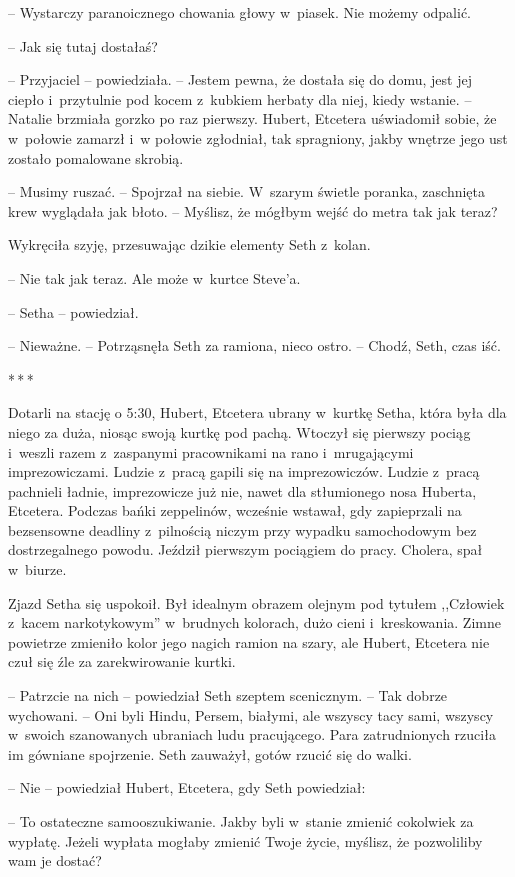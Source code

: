 \documentclass[oneside,polish,11pt,sfheadings]{mwbk}
\newcommand{\threeast}{\bigskip\par\centerline{*\,*\,*}\medskip\par}
\begin{document}
-- Wystarczy paranoicznego chowania głowy w~piasek. Nie możemy odpalić.

-- Jak się tutaj dostałaś?

-- Przyjaciel -- powiedziała. -- Jestem pewna, że dostała się do domu, jest
jej ciepło i~przytulnie pod kocem z~kubkiem herbaty dla niej, kiedy
wstanie. -- Natalie brzmiała gorzko po raz pierwszy. Hubert, Etcetera
uświadomił sobie, że w~połowie zamarzł i~w połowie zgłodniał, tak
spragniony, jakby wnętrze jego ust zostało pomalowane skrobią.

-- Musimy ruszać. -- Spojrzał na siebie. W~szarym świetle poranka,
zaschnięta krew wyglądała jak błoto. -- Myślisz, że mógłbym wejść do
metra tak jak teraz?

Wykręciła szyję, przesuwając dzikie elementy Seth z~kolan. 

-- Nie tak jak
teraz. Ale może w~kurtce Steve'a.

-- Setha -- powiedział.

-- Nieważne. -- Potrząsnęła Seth za ramiona, nieco ostro. -- Chodź, Seth,
czas iść.

\threeast

Dotarli na stację o 5:30, Hubert, Etcetera ubrany w~kurtkę Setha, która
była dla niego za duża, niosąc swoją kurtkę pod pachą. Wtoczył się
pierwszy pociąg i~weszli razem z~zaspanymi pracownikami na rano i~mrugającymi imprezowiczami. Ludzie z~pracą gapili się na imprezowiczów.
Ludzie z~pracą pachnieli ładnie, imprezowicze już nie, nawet dla
stłumionego nosa Huberta, Etcetera. Podczas bańki zeppelinów, wcześnie
wstawał, gdy zapieprzali na bezsensowne deadliny z~pilnością niczym przy
wypadku samochodowym bez dostrzegalnego powodu. Jeździł pierwszym
pociągiem do pracy. Cholera, spał w~biurze.

Zjazd Setha się uspokoił. Był idealnym obrazem olejnym pod tytułem
,,Człowiek z~kacem narkotykowym'' w~brudnych kolorach, dużo cieni i~kreskowania. Zimne powietrze zmieniło kolor jego nagich ramion na szary,
ale Hubert, Etcetera nie czuł się źle za zarekwirowanie kurtki. 

-- Patrzcie na nich -- powiedział Seth szeptem scenicznym. -- Tak dobrze
wychowani. -- Oni byli Hindu, Persem, białymi, ale wszyscy tacy sami,
wszyscy w~swoich szanowanych ubraniach ludu pracującego. Para
zatrudnionych rzuciła im gówniane spojrzenie. Seth zauważył, gotów
rzucić się do walki.

-- Nie -- powiedział Hubert, Etcetera, gdy Seth powiedział: 

-- To ostateczne samooszukiwanie. Jakby byli w~stanie zmienić cokolwiek za
wypłatę. Jeżeli wypłata mogłaby zmienić Twoje życie, myślisz, że
pozwoliliby wam je dostać?
\end{document}
